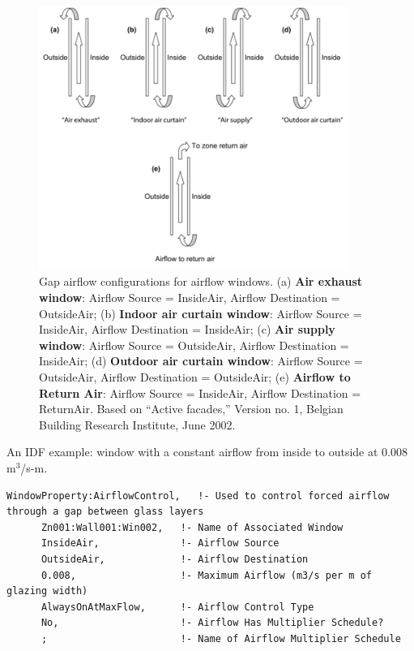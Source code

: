 \begin{figure}[hbtp] %
\centering
\includegraphics[width=0.9\textwidth, height=0.9\textheight, keepaspectratio=true]{media/image065.png}
  \caption{Gap airflow configurations for airflow windows. (a) \textbf{Air exhaust window}: Airflow Source = InsideAir, Airflow Destination = OutsideAir; (b) \textbf{Indoor air curtain window}: Airflow Source = InsideAir, Airflow Destination = InsideAir; (c) \textbf{Air supply window}: Airflow Source = OutsideAir, Airflow Destination = InsideAir; (d) \textbf{Outdoor air curtain window}: Airflow Source = OutsideAir, Airflow Destination = OutsideAir; (e) \textbf{Airflow to Return Air}: Airflow Source = InsideAir, Airflow Destination = ReturnAir. Based on ``Active facades,'' Version no. 1, Belgian Building Research Institute, June 2002. \protect \label{fig:gap-airflow-configurations-for-airflow}}
\end{figure}

An IDF example: window with a constant airflow from inside to outside at 0.008 m\(^{3}\)/s-m.

\begin{lstlisting}
WindowProperty:AirflowControl,   !- Used to control forced airflow through a gap between glass layers
      Zn001:Wall001:Win002,   !- Name of Associated Window
      InsideAir,              !- Airflow Source
      OutsideAir,             !- Airflow Destination
      0.008,                  !- Maximum Airflow (m3/s per m of glazing width)
      AlwaysOnAtMaxFlow,      !- Airflow Control Type
      No,                     !- Airflow Has Multiplier Schedule?
      ;                       !- Name of Airflow Multiplier Schedule
\end{lstlisting}

